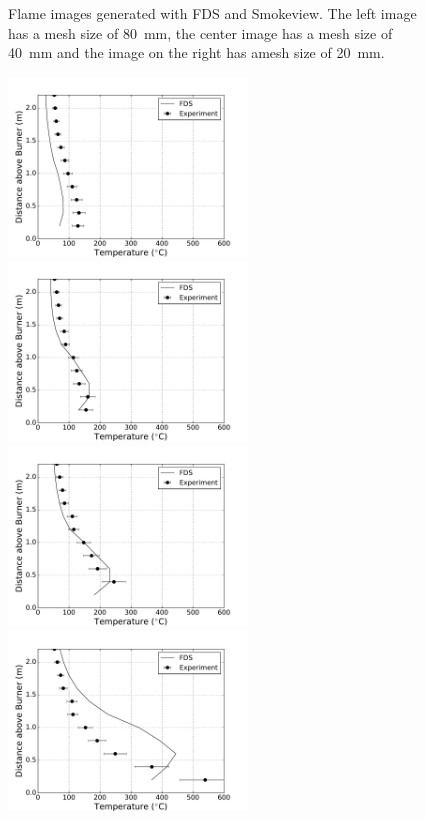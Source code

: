 \documentclass[twoside]{uocthesis}
\begin{document}
\begin{figure}[ht!]
  \caption[Flame images generated with FDS and Smokeview]{Flame images generated with FDS and Smokeview. The left image has a mesh size of 80~mm, the center image has a mesh size of 40~mm and the image on the right has amesh size of 20~mm.}
  \label{FDS_Flame_Image_comp}
\end{figure}

\begin{figure}[ht!]
  \centering
  \includegraphics[width=2.5in]{../Figures/IWGB_NG_TC_Surface_Center_Avg_2D}
  \includegraphics[width=2.5in]{../Figures/IWGB_NG_TC_Surface_Center_Avg_1D}\\
  \includegraphics[width=2.5in]{../Figures/IWGB_NG_TC_Surface_Center_Avg_0p5D}
  \includegraphics[width=2.5in]{../Figures/IWGB_NG_TC_Surface_Center_Avg_0D}\\

\end{figure}
\end{document}
